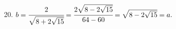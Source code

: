20. $b=\cfrac{2}{\sqrt{8+2\sqrt{15}}}=\cfrac{2\sqrt{8-2\sqrt{15}}}{64-60}=\sqrt{8-2\sqrt{15}}=a.$\\
